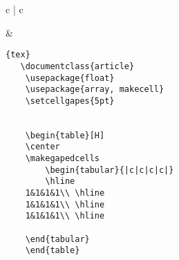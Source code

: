 	\begin{tabular}{c | c}
	\begin{minipage}[m]{0.4\textwidth}
	\end{minipage}
	&
	\begin{minipage}[m]{0.55\textwidth}
	\begin{lstlisting}[basicstyle=\footnotesize]{tex}
   \documentclass{article}
    \usepackage{float}
    \usepackage{array, makecell}
    \setcellgapes{5pt}

    
    \begin{table}[H]
    \center
    \makegapedcells
        \begin{tabular}{|c|c|c|c|}
        \hline
    1&1&1&1\\ \hline
    1&1&1&1\\ \hline
    1&1&1&1\\ \hline
     
    \end{tabular}
    \end{table}

    
	\end{lstlisting}
	\end{minipage}
	\end{tabular}






